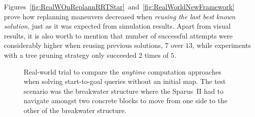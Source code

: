 Figures~\ref{fig:RealWOnReplannRRTStar}~and~\ref{fig:RealWorldNewFramework}
prove how replanning maneuvers decreased when \textit{reusing the last best
known solution}, just as it was expected from simulation results. Apart from
visual results, it is also worth to mention that number of successful attempts
were considerably higher when reusing previous solutions, $7$ over $13$, while
experiments with a tree pruning strategy only succeeded $2$ times of $5$.

\begin{figure}[htbp]
\myfloatalign
     \quad
\caption[Real-world trial to compare the \textit{anytime} computation approaches
when solving start-to-goal queries without an initial map. The test scenario
was the breakwater structure.]
{Real-world trial to compare the \textit{anytime} computation approaches
when solving start-to-goal queries without an initial map. The test scenario
was the breakwater structure where the Sparus~II had to navigate amongst two
concrete blocks to move from one side to the other of the breakwater structure.}
\label{fig:BlocksRealWorldTests}
\end{figure}


